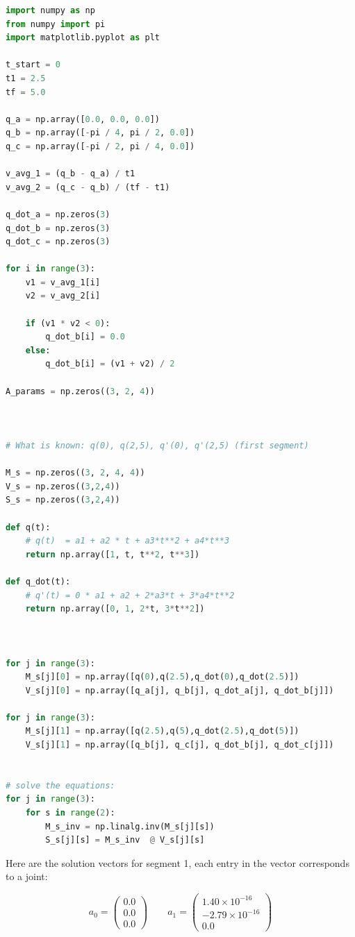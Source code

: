 \documentclass[a4paper,12pt]{article}
\begin{document}
\begin{lstlisting}[language=python, breaklines=true, breakatwhitespace=true]
    import numpy as np
from numpy import pi
import matplotlib.pyplot as plt

t_start = 0
t1 = 2.5 
tf = 5.0  

q_a = np.array([0.0, 0.0, 0.0])
q_b = np.array([-pi / 4, pi / 2, 0.0])
q_c = np.array([-pi / 2, pi / 4, 0.0])

v_avg_1 = (q_b - q_a) / t1
v_avg_2 = (q_c - q_b) / (tf - t1)

q_dot_a = np.zeros(3)
q_dot_b = np.zeros(3)
q_dot_c = np.zeros(3)

for i in range(3):
    v1 = v_avg_1[i]
    v2 = v_avg_2[i]

    if (v1 * v2 < 0):
        q_dot_b[i] = 0.0
    else:
        q_dot_b[i] = (v1 + v2) / 2

A_params = np.zeros((3, 2, 4)) 



# What is known: q(0), q(2,5), q'(0), q'(2,5) (first segment)

M_s = np.zeros((3, 2, 4, 4))
V_s = np.zeros((3,2,4))
S_s = np.zeros((3,2,4))

def q(t):
    # q(t)  = a1 + a2 * t + a3*t**2 + a4*t**3
    return np.array([1, t, t**2, t**3])

def q_dot(t):
    # q'(t) = 0 * a1 + a2 + 2*a3*t + 3*a4*t**2
    return np.array([0, 1, 2*t, 3*t**2])



for j in range(3):
    M_s[j][0] = np.array([q(0),q(2.5),q_dot(0),q_dot(2.5)])
    V_s[j][0] = np.array([q_a[j], q_b[j], q_dot_a[j], q_dot_b[j]])    

for j in range(3):
    M_s[j][1] = np.array([q(2.5),q(5),q_dot(2.5),q_dot(5)])
    V_s[j][1] = np.array([q_b[j], q_c[j], q_dot_b[j], q_dot_c[j]])  
    

# solve the equations:
for j in range(3):
    for s in range(2):
        M_s_inv = np.linalg.inv(M_s[j][s])
        S_s[j][s] = M_s_inv  @ V_s[j][s]


\end{lstlisting}
\newpage
Here are the solution vectors for segment 1, each entry in the vector corresponds to a joint:

\[
a_0 = 
\begin{pmatrix}
0.0 \\
0.0 \\
0.0
\end{pmatrix}
\qquad
a_1 = 
\begin{pmatrix}
1.40\times 10^{-16} \\
-2.79\times 10^{-16} \\
0.0
\end{pmatrix}
\]
\end{document}
